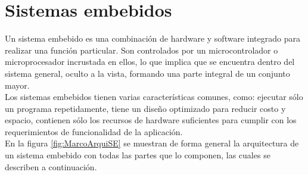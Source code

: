 \section{Sistemas embebidos}
	Un sistema embebido es una combinación de hardware y software integrado para realizar una función particular. Son controlados por un microcontrolador o microprocesador incrustada en ellos, lo que implica que se encuentra dentro del sistema general, oculto a la vista, formando una parte integral de un conjunto mayor. \cite{vahid1999} \\
	
	Los sistemas embebidos tienen varias características comunes, como: ejecutar sólo un programa repetidamente, tiene un diseño optimizado para reducir costo y espacio, contienen sólo los recursos de hardware suficientes para cumplir con  los  requerimientos  de  funcionalidad  de  la  aplicación. \cite{kamal2008} \\
	
	En la figura \ref{fig:MarcoArquiSE} se muestran de forma general la arquitectura de un sistema embebido con todas las partes que lo componen, las cuales se describen a continuación. \cite{nadalEmbebidos} \cite{heath2005}
	
